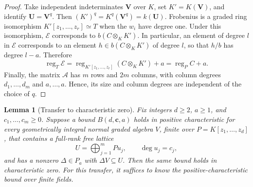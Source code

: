 \documentclass[12pt]{amsart}
\numberwithin{equation}{section}
\newtheorem{lemma}[theorem]{Lemma}
\theoremstyle{definition}
\theoremstyle{remark}
\numberwithin{equation}{section}
\DeclareMathOperator{\reg}{reg}
\begin{document}
\begin{proof}
Take independent indeterminates $\mathbf V$ over $K$, set $K'=K(\mathbf V)$, and identify $\mathbf U=\mathbf V^q$. Then $(K')^q=K^q(\mathbf V^q)=k(\mathbf U)$.
Frobenius is a graded ring isomorphism $K'[z_1,\ldots,z_r]\simeq T$ when the $w_i$ have degree one.
Under this isomorphism, $\mathcal E$ corresponds to $b(C\otimes_KK')$. In particular, an element of degree $l$
in $\mathcal E$ corresponds to an element $h\in b(C\otimes_KK')$ of degree $l$, so that $h/b$ has degree $l-a$. Therefore
\[
 \reg_T\mathcal E
 =\reg_{K'[z_1,\ldots,z_r]}(C\otimes_KK')+a
 =\reg_PC+a.
\]
Finally, the matrix $\mathcal A$ has $m$ rows and $2m$ columns, with column degrees $d_1,\ldots,d_m$ and
$a,\ldots,a$. Hence, its size and column degrees are independent of the choice of $q$.
\end{proof}

\begin{lemma}[Transfer to characteristic zero]
\label{lem:char-zero-transfer}
Fix integers $d\ge2$, $a\ge1$, and $c_1,\ldots,c_m\ge0$. Suppose a bound $B(d,\mathbf c,a)$ holds in positive characteristic for every geometrically integral normal graded algebra $V$, finite over $P=K[z_1,\ldots,z_d]$, that contains a full-rank free  lattice
\[
 U=\bigoplus_{j=1}^mPu_j,\qquad \deg u_j=c_j,
\]
and has a nonzero $\Delta\in P_a$ with $\Delta V\subseteq U$. Then the same bound holds in characteristic zero.
For this transfer, it suffices to know the positive-characteristic bound over finite fields.
\end{lemma}
\end{document}
